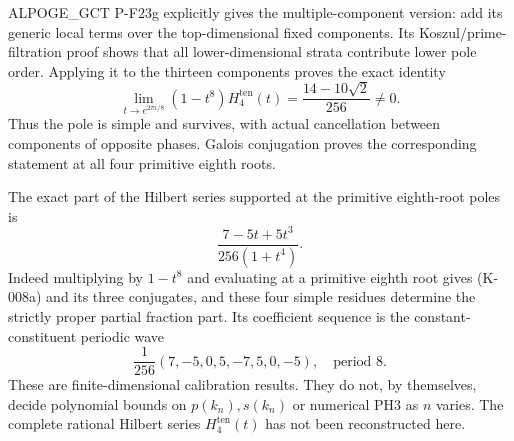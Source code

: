 ALPOGE\_GCT P-F23g explicitly gives the multiple-component version:
add its generic local terms over the top-dimensional fixed components.
Its Koszul/prime-filtration proof shows that all lower-dimensional
strata contribute lower pole order. Applying
it to the thirteen components proves the exact identity
\[
 \boxed{\displaystyle
 \lim_{t\to e^{2\pi i/8}}(1-t^8)H^{\mathrm{ten}}_4(t)
                  =\frac{14-10\sqrt2}{256}\ne0.}              \tag{K-008a}
\]
Thus the pole is simple and survives, with actual cancellation
between components of opposite phases. Galois conjugation proves
the corresponding statement at all four primitive eighth roots.

The exact part of the Hilbert series supported at the primitive
 eighth-root poles is
\[
             \frac{7-5t+5t^3}{256(1+t^4)}.                    \tag{K-008b}
\]
Indeed multiplying by $1-t^8$ and evaluating at a primitive eighth
root gives (K-008a) and its three conjugates, and these four simple
residues determine the strictly proper partial fraction part.
Its coefficient sequence is the constant-constituent periodic wave
\[
       \frac1{256}(7,-5,0,5,-7,5,0,-5),\quad\text{period }8.    \tag{K-008c}
\]
These are finite-dimensional calibration results. They do not,
by themselves, decide polynomial bounds on $p(k_n),s(k_n)$ or
numerical PH3 as $n$ varies. The complete rational Hilbert series
$H^{\mathrm{ten}}_4(t)$ has not been reconstructed here.
